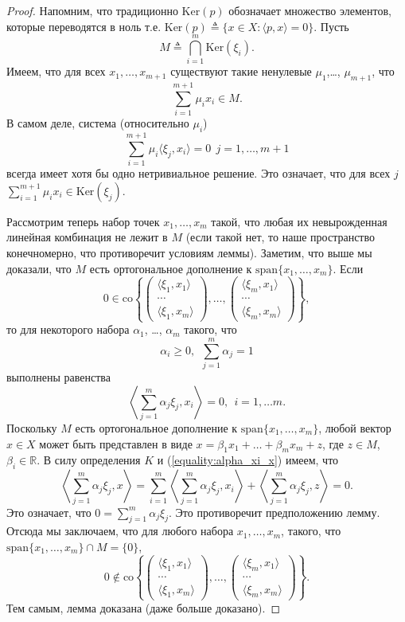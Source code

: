 \documentclass[a4paper,12pt]{report}
\begin{document}
\begin{proof}
	Напомним, что традиционно $\mathrm{Ker}(p)$ обозначает множество элементов, которые переводятся в ноль т.е. $\mathrm{Ker}(p)\triangleq \{x\in X:\langle p,x\rangle=0\}$. Пусть 
	$$M\triangleq \bigcap_{i=1}^m\mathrm{Ker}(\xi_i). $$ Имеем, что для всех $x_1,\ldots,x_{m+1}$ существуют такие ненулевые $\mu_1$,\ldots, $\mu_{m+1}$, что
	$$\sum_{i=1}^{m+1}\mu_i x_i\in M. $$ В самом деле, система (относительно $\mu_i$)
	$$\sum_{i=1}^{m+1}\mu_i\langle \xi_j, x_i\rangle=0 \ \ j=1,\ldots, m+1$$ всегда имеет хотя бы одно нетривиальное решение. Это означает, что для всех $j$ $\sum_{i=1}^{m+1}\mu_i x_i\in \mathrm{Ker}(\xi_j)$. 
	
	Рассмотрим теперь набор точек $x_1,\ldots,x_m$ такой, что любая их невырожденная линейная комбинация не лежит в $M$ (если такой нет, то наше пространство конечномерно, что противоречит условиям леммы). Заметим, что выше мы доказали, что $M$ есть ортогональное дополнение к $\mathrm{span}\{x_1,\ldots,x_m\}. $ Если
	$$0\in  \mathrm{co}\left\{\left(\begin{array}{c}\langle \xi_1,x_1\rangle \\ \cdots \\\langle \xi_1,x_m\rangle\end{array}\right),\ldots,\left(\begin{array}{c}\langle \xi_m,x_1\rangle \\ \cdots \\\langle \xi_m,x_m\rangle\end{array}\right)\right\},  $$ то 
	для некоторого набора $\alpha_1$, \ldots, $\alpha_m$ такого, что 
	$$\alpha_i\geq 0,\ \ \sum_{j=1}^m \alpha_j=1 $$ выполнены равенства
	\begin{equation}\label{equality:alpha_xi_x}
	\left\langle\sum_{j=1}^m\alpha_j \xi_j,x_i\right\rangle=0,\ \ i=1,\ldots m. 
	\end{equation} Поскольку $M$ есть ортогональное дополнение к $\mathrm{span}\{x_1,\ldots, x_m\}$, любой вектор $x\in X$ может быть представлен в виде $x=\beta_1 x_1+\ldots+\beta_m x_m+z$, где $z\in M$, $\beta_i\in \mathbb{R}$. В силу определения $K$ и (\ref{equality:alpha_xi_x}) имеем, что
	$$\left\langle\sum_{j=1}^m\alpha_j \xi_j,x\right\rangle=\sum_{i=1}^m\left\langle \sum_{j=1}^m \alpha_j \xi_j,x_i\right\rangle+\left\langle \sum_{j=1}^m \alpha_j \xi_j,z\right\rangle=0. $$ Это означает, что $0=\sum_{j=1}^m\alpha_j \xi_j$. Это противоречит предположению лемму. Отсюда мы заключаем, что для любого набора $x_1,\ldots,x_m$, такого, что $\mathrm{span}\{x_1,\ldots,x_m\}\cap M=\{0\}$,
	$$0\notin  \mathrm{co}\left\{\left(\begin{array}{c}\langle \xi_1,x_1\rangle \\ \cdots \\\langle \xi_1,x_m\rangle\end{array}\right),\ldots,\left(\begin{array}{c}\langle \xi_m,x_1\rangle \\ \cdots \\\langle \xi_m,x_m\rangle\end{array}\right)\right\}.$$ Тем самым, лемма доказана (даже больше доказано).
\end{proof}
\end{document}
